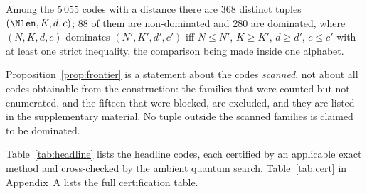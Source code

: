 \begin{proposition}\label{prop:frontier}
Among the $5\,055$ codes with a distance there are $368$ distinct tuples
$(\Nlen,K,d,c)$; $88$ of them are non-dominated and $280$ are dominated, where
$(N,K,d,c)$ dominates $(N',K',d',c')$ iff
$N\le N'$, $K\ge K'$, $d\ge d'$, $c\le c'$ with at least one strict
inequality, the comparison being made inside one alphabet.
\end{proposition}

\begin{remark}
Proposition~\ref{prop:frontier} is a statement about the codes \emph{scanned},
not about all codes obtainable from the construction: the families that were
counted but not enumerated, and the fifteen that were blocked, are excluded, and
they are listed in the supplementary material. No tuple outside the scanned
families is claimed to be dominated.
\end{remark}

Table~\ref{tab:headline} lists the headline codes, each certified by an
applicable exact method and cross-checked by the ambient quantum search. Table~\ref{tab:cert} in Appendix~A lists the full certification table.

